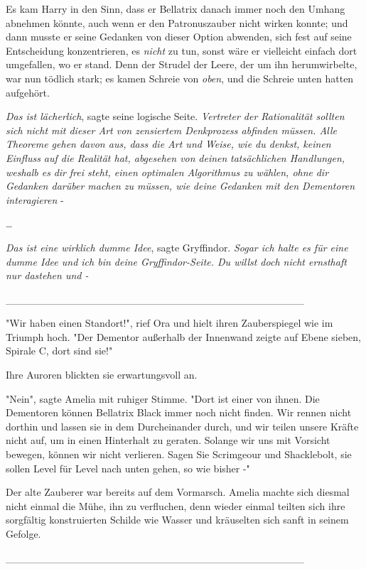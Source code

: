 {Es kam Harry in den Sinn, dass er Bellatrix danach immer noch den Umhang abnehmen könnte, auch wenn er den Patronuszauber nicht wirken konnte; und dann musste er seine Gedanken von dieser Option abwenden, sich fest auf seine Entscheidung konzentrieren, es \emph{nicht} zu tun, sonst wäre er vielleicht einfach dort umgefallen, wo er stand. Denn der Strudel der Leere, der um ihn herumwirbelte, war nun tödlich stark; es kamen Schreie von \emph{oben}, und die Schreie unten hatten aufgehört.

\emph{Das ist lächerlich}, sagte seine logische Seite. \emph{Vertreter der Rationalität sollten sich nicht mit dieser Art von zensiertem Denkprozess abfinden müssen. Alle Theoreme gehen davon aus, dass die Art und Weise, wie du denkst, keinen Einfluss auf die Realität hat, abgesehen von} \emph{deinen} \emph{tatsächlichen Handlungen, weshalb es} \emph{dir} \emph{frei steht, einen optimalen Algorithmus zu wählen, ohne} \emph{dir} \emph{Gedanken darüber machen zu müssen, wie} \emph{deine} \emph{Gedanken mit den Dementoren interagieren} -

…

\emph{Das ist eine wirklich dumme Idee}, sagte Gryffindor. \emph{Sogar ich halte es für eine dumme Idee und ich bin deine Gryffindor-Seite. Du willst doch nicht ernsthaft nur dastehen und -}

\_\_\_\_\_\_\_\_\_\_\_\_\_\_\_\_\_\_\_\_\_\_\_\_\_\_\_\_\_\_\_\_\_\_\_\_\_\_\_\_

"Wir haben einen Standort!", rief Ora und hielt ihren Zauberspiegel wie im Triumph hoch. "Der Dementor außerhalb der Innenwand zeigte auf Ebene sieben, Spirale C, dort sind sie!"

Ihre Auroren blickten sie erwartungsvoll an.

"Nein", sagte Amelia mit ruhiger Stimme. "Dort ist einer von ihnen. Die Dementoren können Bellatrix Black immer noch nicht finden. Wir rennen nicht dorthin und lassen sie in dem Durcheinander durch, und wir teilen unsere Kräfte nicht auf, um in einen Hinterhalt zu geraten. Solange wir uns mit Vorsicht bewegen, können wir nicht verlieren. Sagen Sie Scrimgeour und Shacklebolt, sie sollen Level für Level nach unten gehen, so wie bisher -"

Der alte Zauberer war bereits auf dem Vormarsch. Amelia machte sich diesmal nicht einmal die Mühe, ihn zu verfluchen, denn wieder einmal teilten sich ihre sorgfältig konstruierten Schilde wie Wasser und kräuselten sich sanft in seinem Gefolge.

\_\_\_\_\_\_\_\_\_\_\_\_\_\_\_\_\_\_\_\_\_\_\_\_\_\_\_\_\_\_\_\_\_\_\_\_\_\_\_\_

}

